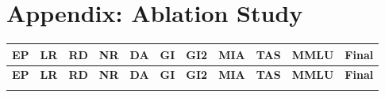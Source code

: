\documentclass[11pt]{article}
\begin{document}
%



\newpage
\appendix
\onecolumn
\section{Appendix: Ablation Study}\nopagebreak[4]
\label{sec:appendixA}


\begin{longtable}[h]{|r|r|l|l|l|l|l|r|r|l|r|}
\hline
\multicolumn{1}{|c|}{\textbf{EP}} & \multicolumn{1}{c|}{\textbf{LR}} & \multicolumn{1}{c|}{\textbf{RD}} & \multicolumn{1}{c|}{\textbf{NR}} & \multicolumn{1}{c|}{\textbf{DA}} & \multicolumn{1}{c|}{\textbf{GI}} & \multicolumn{1}{c|}{\textbf{GI2}} & \multicolumn{1}{c|}{\textbf{MIA}} & \multicolumn{1}{c|}{\textbf{TAS}} & \multicolumn{1}{c|}{\textbf{MMLU}} & \multicolumn{1}{c|}{\textbf{Final}} \\ 
\hline
\endfirsthead

\hline
\multicolumn{1}{|c|}{\textbf{EP}} & \multicolumn{1}{c|}{\textbf{LR}} & \multicolumn{1}{c|}{\textbf{RD}} & \multicolumn{1}{c|}{\textbf{NR}} & \multicolumn{1}{c|}{\textbf{DA}} & \multicolumn{1}{c|}{\textbf{GI}} & \multicolumn{1}{c|}{\textbf{GI2}} & \multicolumn{1}{c|}{\textbf{MIA}} & \multicolumn{1}{c|}{\textbf{TAS}} & \multicolumn{1}{c|}{\textbf{MMLU}} & \multicolumn{1}{c|}{\textbf{Final}} \\
\hline
\endhead

\hline
\endfoot


\end{longtable}
\end{document}
